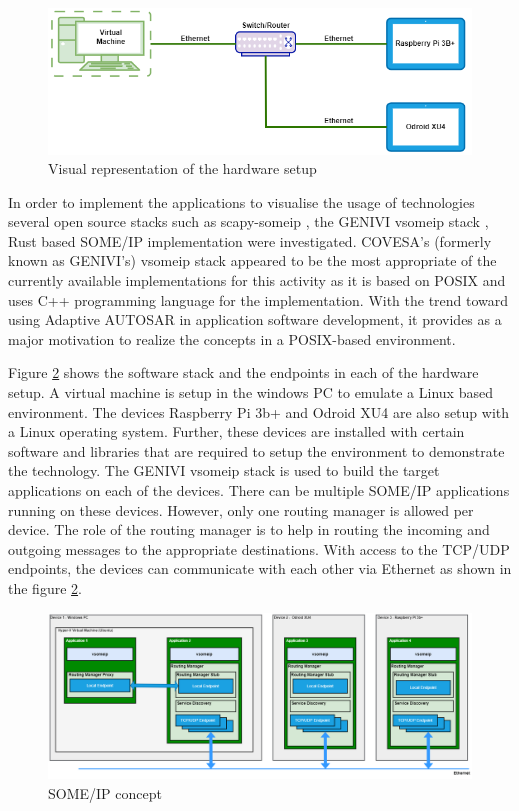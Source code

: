 \begin{figure}[!htb]
	\centering
		\includegraphics[width=1\textwidth]{images/Visual_representation_of_hardware_setup.png}
	\caption{Visual representation of the hardware setup}
	\label{fig:Visual_representation_of_hardware_setup}
\end{figure}
\par In order to implement the applications to visualise the usage of technologies several open source stacks such as scapy-someip \cite{scapy_someip}, the GENIVI vsomeip stack  \cite{b_genivi_vsomeip}, Rust based SOME/IP implementation \cite{rust_someip} were investigated. COVESA's (formerly known as GENIVI's) vsomeip stack appeared to be the most appropriate of the currently available implementations for this activity as it is based on POSIX and uses C++ programming language for the implementation. With the trend toward using Adaptive AUTOSAR\cite{b_adaptive_platform} in application software development, it provides as a major motivation to realize the concepts in a POSIX-based environment. 
\par Figure \ref{fig:SOMEIP_concept} shows the software stack and the endpoints in each of the hardware setup. A virtual machine is setup in the windows PC to emulate a Linux based environment. The devices Raspberry Pi 3b+ and Odroid XU4 are also setup with a Linux operating system. Further, these devices are installed with certain software and libraries that are required to setup the environment to demonstrate the technology. The GENIVI vsomeip stack is used to build the target applications on each of the devices. There can be multiple SOME/IP applications running on these devices. However, only one routing manager is allowed per device. The role of the routing manager is to help in routing the incoming and outgoing messages to the appropriate destinations. With access to the TCP/UDP endpoints, the devices can communicate with each other via Ethernet as shown in the figure \ref{fig:SOMEIP_concept}. 
 
\begin{figure}[!htb]
	\centering
		\includegraphics[width=1\textwidth]{images/SOMEIP_concept.png}
	\caption{SOME/IP concept}
	\label{fig:SOMEIP_concept}
\end{figure}

